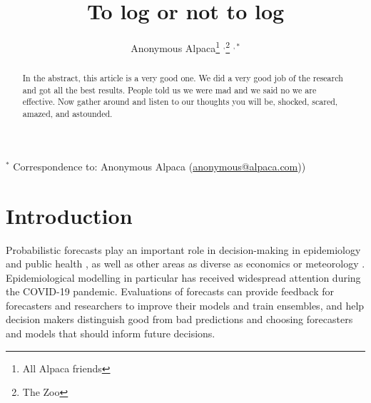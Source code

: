 \documentclass{article}
\begin{document}
\title{To log or not to log}
  \author{Anonymous Alpaca\thanks{All Alpaca friends} $^{,}$\thanks{The Zoo} $^{ , *}$}

\maketitle


\begin{abstract}
In the abstract, this article is a very good one. We did a very good job of the research and got all the best results. People told us we were mad and we said no we are effective. Now gather around and listen to our thoughts you will be, shocked, scared, amazed, and astounded.
\end{abstract}

\bigskip

{\footnotesize $^*$ Correspondence to: Anonymous Alpaca (\url{anonymous@alpaca.com}))}



\newpage


\section{Introduction}

Probabilistic forecasts \citep{heldProbabilisticForecastingInfectious2017} play an important role in decision-making in epidemiology and public health \citep{reichCollaborativeMultiyearMultimodel2019, funkShorttermForecastsInform2020, cramerEvaluationIndividualEnsemble2021, bracherShorttermForecastingCOVID192021, europeancovid-19forecasthubEuropeanCovid19Forecast2021, sherrattPredictivePerformanceMultimodel2022}, as well as other areas as diverse as economics \citep{timmermannForecastingMethodsFinance2018, elliottForecastingEconomicsFinance2016} or meteorology \citep{gneitingWeatherForecastingEnsemble2005, kukkonenReviewOperationalRegionalscale2012}. Epidemiological modelling in particular has received widespread attention during the COVID-19 pandemic. Evaluations of forecasts can provide feedback for forecasters and researchers to improve their models and train ensembles, and help decision makers distinguish good from bad predictions and choosing forecasters and models that should inform future decisions.
\end{document}
